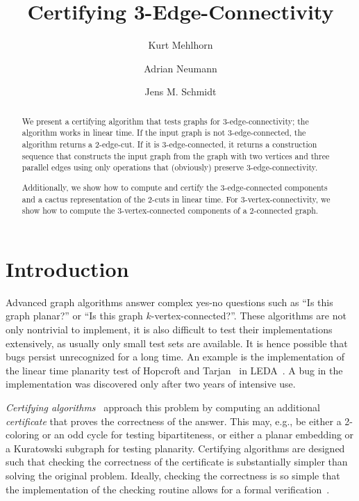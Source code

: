 \documentclass[paper=a4]{scrartcl}
\title{Certifying 3-Edge-Connectivity}\author{Kurt Mehlhorn \and Adrian Neumann \and Jens M. Schmidt}
\begin{document}
\maketitle
\begin{abstract} We present a certifying algorithm that tests
  graphs for 3-edge-connectivity; the algorithm works in linear time.  If the input graph is not
  3-edge-connected, the algorithm returns a 2-edge-cut. If it is
  3-edge-connected, it returns a construction sequence that
  constructs the input graph from the graph with two vertices and three parallel edges using
  only operations that (obviously) preserve 3-edge-connectivity.

Additionally, we show how to compute and certify the $3$-edge-connected components and a cactus representation of the $2$-cuts in linear time. For $3$-vertex-connectivity, we show how to compute the $3$-vertex-connected components of a $2$-connected graph.
\end{abstract}



\section{Introduction}
Advanced graph algorithms answer complex yes-no questions such as ``Is this graph planar?'' or ``Is this graph $k$-vertex-connected?''. These algorithms are not only nontrivial to implement, it is also difficult to test their implementations extensively, as usually only small test sets are available. It is hence possible that bugs persist unrecognized for a long time. An example is the implementation of the linear time planarity test of Hopcroft and Tarjan~\cite{HT} in LEDA~\cite{Mehlhorn1999}. A bug in the implementation was discovered only after two years of intensive use.

\emph{Certifying algorithms}~\cite{McConnell2011} approach this problem by computing an additional \emph{certificate} that proves the correctness of the answer. This may, e.g., be either a 2-coloring or an odd cycle for testing bipartiteness, or either a planar embedding or a Kuratowski subgraph for testing planarity. Certifying algorithms are designed such that checking the correctness of the certificate is substantially simpler than solving the original problem. Ideally, checking the correctness is so simple that the implementation of the checking routine allows for a formal verification~\cite{FormalVerification,Verification-CertComps-AutoCorres-Simpl}.
\end{document}
